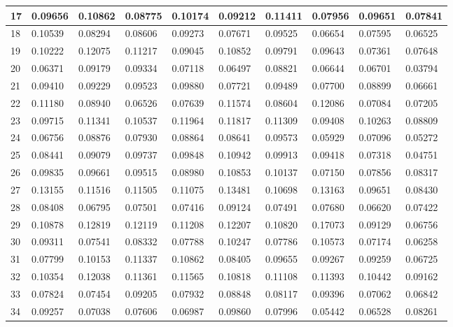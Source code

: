 \begin{table}[H]
{\begin{tabular}{|l|l|l|l|l|l|l|l|l|l|}
        17 & 0.09656 & 0.10862 & 0.08775 & 0.10174 & 0.09212 & 0.11411 & 0.07956 & 0.09651 & 0.07841 \\ \hline
        18 & 0.10539 & 0.08294 & 0.08606 & 0.09273 & 0.07671 & 0.09525 & 0.06654 & 0.07595 & 0.06525 \\ \hline
        19 & 0.10222 & 0.12075 & 0.11217 & 0.09045 & 0.10852 & 0.09791 & 0.09643 & 0.07361 & 0.07648 \\ \hline
        20 & 0.06371 & 0.09179 & 0.09334 & 0.07118 & 0.06497 & 0.08821 & 0.06644 & 0.06701 & 0.03794 \\ \hline
        21 & 0.09410 & 0.09229 & 0.09523 & 0.09880 & 0.07721 & 0.09489 & 0.07700 & 0.08899 & 0.06661 \\ \hline
        22 & 0.11180 & 0.08940 & 0.06526 & 0.07639 & 0.11574 & 0.08604 & 0.12086 & 0.07084 & 0.07205 \\ \hline
        23 & 0.09715 & 0.11341 & 0.10537 & 0.11964 & 0.11817 & 0.11309 & 0.09408 & 0.10263 & 0.08809 \\ \hline
        24 & 0.06756 & 0.08876 & 0.07930 & 0.08864 & 0.08641 & 0.09573 & 0.05929 & 0.07096 & 0.05272 \\ \hline
        25 & 0.08441 & 0.09079 & 0.09737 & 0.09848 & 0.10942 & 0.09913 & 0.09418 & 0.07318 & 0.04751 \\ \hline
        26 & 0.09835 & 0.09661 & 0.09515 & 0.08980 & 0.10853 & 0.10137 & 0.07150 & 0.07856 & 0.08317 \\ \hline
        27 & 0.13155 & 0.11516 & 0.11505 & 0.11075 & 0.13481 & 0.10698 & 0.13163 & 0.09651 & 0.08430 \\ \hline
        28 & 0.08408 & 0.06795 & 0.07501 & 0.07416 & 0.09124 & 0.07491 & 0.07680 & 0.06620 & 0.07422 \\ \hline
        29 & 0.10878 & 0.12819 & 0.12119 & 0.11208 & 0.12207 & 0.10820 & 0.17073 & 0.09129 & 0.06756 \\ \hline
        30 & 0.09311 & 0.07541 & 0.08332 & 0.07788 & 0.10247 & 0.07786 & 0.10573 & 0.07174 & 0.06258 \\ \hline
        31 & 0.07799 & 0.10153 & 0.11337 & 0.10862 & 0.08405 & 0.09655 & 0.09267 & 0.09259 & 0.06725 \\ \hline
        32 & 0.10354 & 0.12038 & 0.11361 & 0.11565 & 0.10818 & 0.11108 & 0.11393 & 0.10442 & 0.09162 \\ \hline
        33 & 0.07824 & 0.07454 & 0.09205 & 0.07932 & 0.08848 & 0.08117 & 0.09396 & 0.07062 & 0.06842 \\ \hline
        34 & 0.09257 & 0.07038 & 0.07606 & 0.06987 & 0.09860 & 0.07996 & 0.05442 & 0.06528 & 0.08261 \\ \hline

\end{tabular}}
\end{table}
